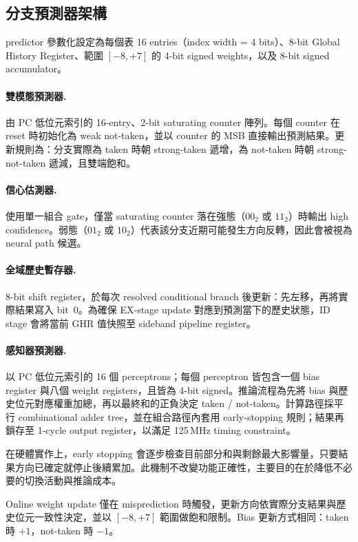 \documentclass[12pt,a4paper]{article}
\begin{document}
	\subsection{分支預測器架構}
	\label{sec:bp-arch}

	predictor 參數化設定為每個表 16 entries（index width = 4 bits）、8-bit Global History Register、範圍 $[-8,+7]$ 的 4-bit signed weights，以及 8-bit signed accumulator。

	\paragraph{雙模態預測器.}
	由 PC 低位元索引的 16-entry、2-bit saturating counter 陣列。每個 counter 在 reset 時初始化為 weak not-taken，並以 counter 的 MSB 直接輸出預測結果。更新規則為：分支實際為 taken 時朝 strong-taken 遞增，為 not-taken 時朝 strong-not-taken 遞減，且雙端飽和。

	\paragraph{信心估測器.}
	使用單一組合 gate，僅當 saturating counter 落在強態（$00_2$ 或 $11_2$）時輸出 high confidence。弱態（$01_2$ 或 $10_2$）代表該分支近期可能發生方向反轉，因此會被視為 neural path 候選。

	\paragraph{全域歷史暫存器.}
	8-bit shift register，於每次 resolved conditional branch 後更新：先左移，再將實際結果寫入 bit~0。為確保 EX-stage update 對應到預測當下的歷史狀態，ID stage 會將當前 GHR 值快照至 sideband pipeline register。

	\paragraph{感知器預測器.}
	以 PC 低位元索引的 16 個 perceptrons；每個 perceptron 皆包含一個 bias register 與八個 weight registers，且皆為 4-bit signed。推論流程為先將 bias 與歷史位元對應權重加總，再以最終和的正負決定 taken / not-taken。計算路徑採平行 combinational adder tree，並在組合路徑內套用 early-stopping 規則；結果再鎖存至 1-cycle output register，以滿足 125\,MHz timing constraint。

	在硬體實作上，early stopping 會逐步檢查目前部分和與剩餘最大影響量，只要結果方向已確定就停止後續累加。此機制不改變功能正確性，主要目的在於降低不必要的切換活動與推論成本。

	Online weight update 僅在 misprediction 時觸發，更新方向依實際分支結果與歷史位元一致性決定，並以 $[-8,+7]$ 範圍做飽和限制。Bias 更新方式相同：taken 時 $+1$，not-taken 時 $-1$。
\end{document}

